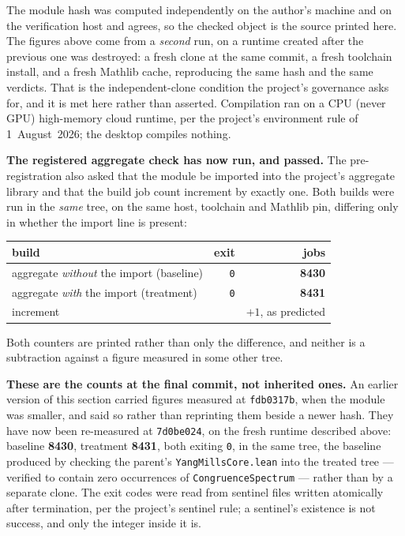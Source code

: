 \documentclass[11pt,a4paper]{article}
\theoremstyle{plain}
\theoremstyle{definition}
\begin{document}
The module hash was computed independently on the author's machine and on the
verification host and agrees, so the checked object is the source printed here.
The figures above come from a \emph{second} run, on a runtime created after the
previous one was destroyed: a fresh clone at the same commit, a fresh toolchain
install, and a fresh Mathlib cache, reproducing the same hash and the same
verdicts. That is the independent-clone condition the project's governance asks
for, and it is met here rather than asserted.
Compilation ran on a CPU (never GPU) high-memory cloud runtime, per the
project's environment rule of 1~August~2026; the desktop compiles nothing.

\textbf{The registered aggregate check has now run, and passed.} The
pre-registration also asked that the module be imported into the project's
aggregate library and that the build job count increment by exactly one. Both
builds were run in the \emph{same} tree, on the same host, toolchain and Mathlib
pin, differing only in whether the import line is present:

\begin{center}
\begin{tabular}{lrr}
\toprule
build & exit & jobs \\
\midrule
aggregate \emph{without} the import (baseline) & \texttt{0} & \textbf{8430} \\
aggregate \emph{with} the import (treatment)   & \texttt{0} & \textbf{8431} \\
\midrule
increment & & \textbf{$+1$}, as predicted \\
\bottomrule
\end{tabular}
\end{center}

Both counters are printed rather than only the difference, and neither is a
subtraction against a figure measured in some other tree.

\textbf{These are the counts at the final commit, not inherited ones.} An earlier
version of this section carried figures measured at \texttt{fdb0317b}, when the
module was smaller, and said so rather than reprinting them beside a newer hash.
They have now been re-measured at \texttt{7d0be024}, on the fresh runtime
described above: baseline \textbf{8430}, treatment \textbf{8431}, both exiting
\texttt{0}, in the same tree, the baseline produced by checking the parent's
\texttt{YangMillsCore.lean} into the treated tree --- verified to contain zero
occurrences of \texttt{CongruenceSpectrum} --- rather than by a separate clone.
The exit codes were read from sentinel files written atomically after
termination, per the project's sentinel rule; a sentinel's existence is not
success, and only the integer inside it is.
\end{document}
